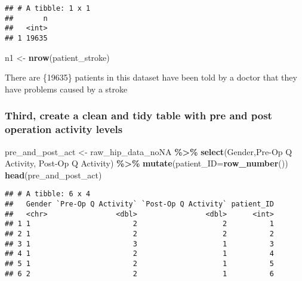 \documentclass[
]{article}
\newenvironment{Shaded}{\begin{snugshade}}{\end{snugshade}}
\newcommand{\AttributeTok}[1]{\textcolor[rgb]{0.13,0.29,0.53}{#1}}
\newcommand{\FunctionTok}[1]{\textcolor[rgb]{0.13,0.29,0.53}{\textbf{#1}}}
\newcommand{\NormalTok}[1]{#1}
\newcommand{\OtherTok}[1]{\textcolor[rgb]{0.56,0.35,0.01}{#1}}
\newcommand{\SpecialCharTok}[1]{\textcolor[rgb]{0.81,0.36,0.00}{\textbf{#1}}}
\newcommand{\StringTok}[1]{\textcolor[rgb]{0.31,0.60,0.02}{#1}}
\begin{document}
\begin{verbatim}
## # A tibble: 1 x 1
##       n
##   <int>
## 1 19635
\end{verbatim}

\begin{Shaded}
\begin{Highlighting}[]
\NormalTok{n1 }\OtherTok{\textless{}{-}} \FunctionTok{nrow}\NormalTok{(patient\_stroke)}
\end{Highlighting}
\end{Shaded}

There are \{19635\} patients in this dataset have been told by a doctor
that they have problems caused by a stroke

\subsubsection{Third, create a clean and tidy table with pre and post
operation activity
levels}\label{third-create-a-clean-and-tidy-table-with-pre-and-post-operation-activity-levels}

\begin{Shaded}
\begin{Highlighting}[]
\NormalTok{pre\_and\_post\_act }\OtherTok{\textless{}{-}}\NormalTok{ raw\_hip\_data\_noNA }\SpecialCharTok{\%\textgreater{}\%} 
  \FunctionTok{select}\NormalTok{(}\StringTok{\textquotesingle{}Gender\textquotesingle{}}\NormalTok{,}\StringTok{\textquotesingle{}Pre{-}Op Q Activity\textquotesingle{}}\NormalTok{, }\StringTok{\textquotesingle{}Post{-}Op Q Activity\textquotesingle{}}\NormalTok{) }\SpecialCharTok{\%\textgreater{}\%} 
  \FunctionTok{mutate}\NormalTok{(}\AttributeTok{patient\_ID=}\FunctionTok{row\_number}\NormalTok{())}
\FunctionTok{head}\NormalTok{(pre\_and\_post\_act)}
\end{Highlighting}
\end{Shaded}

\begin{verbatim}
## # A tibble: 6 x 4
##   Gender `Pre-Op Q Activity` `Post-Op Q Activity` patient_ID
##   <chr>                <dbl>                <dbl>      <int>
## 1 1                        2                    2          1
## 2 1                        2                    2          2
## 3 1                        3                    1          3
## 4 1                        2                    1          4
## 5 1                        2                    1          5
## 6 2                        2                    1          6
\end{verbatim}
\end{document}
